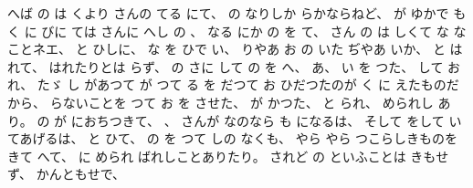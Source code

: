 %
へば
の
は
くより
さんの
てる
にて、
%
の
なりしか
らかならねど、
%
が
ゆかで
も
く
に
びに
ては
さんに
へし
の
、
%
なる
にか
の
を
て、
%
さん
の
は
しくて
な
なことネエ、
%
と
ひしに、
%
な
を
ひで
い、
%
りやあ
お
の
いた
ぢやあ
いか、
%
と
はれて、
%
はれたりとは
らず、
%
の
さに
して
の
を
へ、
%
あ、
%
い
を
つた、
%
して%
お
れ、
%
たゞ
し
があつて
が
つて
る
を
だつて
お
ひだつたのが
く
に
えたものだから、
%
らないことを
つて
お
を
させた、
%
が
かつた、
%
と
られ、
%
められし
あり。%
%
の
が
におちつきて、
%
、
%
さんが
なのなら
も
になるは、
%
そして
をして
いてあげるは、
%
と
ひて、
%
の
を
つて
しの
なくも、
%
やら
やら
つこらしきものを
きて
へて、
%
に
められ
ばれしことありたり。
%
されど
の
といふことは
きもせず、
%
かんともせで、
%
